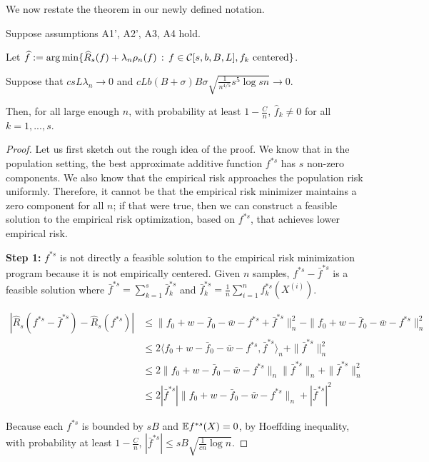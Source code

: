 We now restate the theorem in our newly defined notation.
 
\begin{theorem} 
Suppose assumptions A1', A2', A3, A4 hold. 

Let $\displaystyle \widehat{f} := \arg\min \{ \widehat{R}_s(f) + \lambda_n \rho_n(f) \,:\, f \in \mathcal{C}[s,b,B,L], f_k \textrm{ centered} \}$.

Suppose that $c s L \lambda_n \rightarrow 0$ and $c L b (B+\sigma)B\sigma \sqrt{\frac{1}{n^{4/5}} s^5 \log sn} \rightarrow 0$.

Then, for all large enough $n$, with probability at least $1-\frac{C}{n}$, $\hat{f}_k \neq 0$ for all $k =1,...,s$.
\end{theorem}

\begin{proof}
Let us first sketch out the rough idea of the proof. We know that in the population setting, the best approximate additive function $f^{*s}$ has $s$ non-zero components. We also know that the empirical risk approaches the population risk uniformly. Therefore, it cannot be that the empirical risk minimizer maintains a zero component for all $n$; if that were true, then we can construct a feasible solution to the empirical risk optimization, based on $f^{*s}$, that achieves lower empirical risk. 


\textbf{Step 1:} $f^{*s}$ is not directly a feasible solution to the empirical risk minimization program because it is not empirically centered. Given $n$ samples, $f^{*s} - \bar{f}^{*s}$ is a feasible solution where $\bar{f}^{*s} = \sum_{k=1}^s \bar{f}_k^{*s}$ and $\bar{f}_k^{*s} = \frac{1}{n} \sum_{i=1}^n f_k^{*s}(X^{(i)})$. 

\begin{align*}
|\hat{R}_s(f^{*s} - \bar{f}^{*s}) - \hat{R}_s(f^{*s})| &\leq 
         \| f_0 + w - \bar{f}_0 - \bar{w}
         - f^{*s} + \bar{f}^{*s} \|_n^2  - \| f_0 + w - \bar{f}_0 - \bar{w} - f^{*s}\|_n^2 \\
   &\leq 2 \langle f_0 + w - \bar{f}_0 - \bar{w} - f^{*s}, \bar{f}^{*s} \rangle_n 
         + \| \bar{f}^{*s} \|_n^2 \\
   &\leq 2\| f_0 + w - \bar{f}_0 - \bar{w} -f^{*s}\|_n 
                \|\bar{f}^{*s} \|_n 
                  + \|\bar{f}^{*s} \|_n^2 \\
   &\leq 2 | \bar{f}^{*s} | \| f_0 + w 
           - \bar{f}_0 - \bar{w} - f^{*s} \|_n + |\bar{f}^{*s}|^2 
\end{align*}

Because each $f^{*s}$ is bounded by $sB$ and ${\mathbb E} f^{*s}(X) = 0$, by Hoeffding inequality, with probability at least $1-\frac{C}{n}$, $|\bar{f}^{*s}| \leq sB \sqrt{\frac{1}{cn} \log n}$. 


\end{proof}

